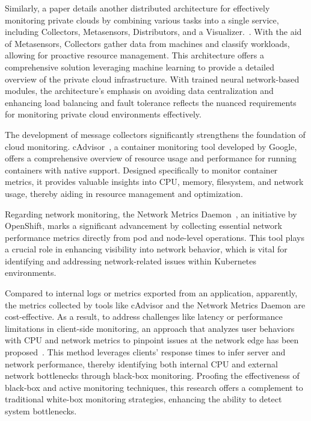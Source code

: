 Similarly, a paper details another distributed architecture for effectively monitoring private clouds by combining various tasks into a single service, including Collectors, Metasensors, Distributors, and a Visualizer.~\parencite{perez-espinozaDistributedArchitectureMonitoring2015}. With the aid of Metasensors, Collectors gather data from machines and classify workloads, allowing for proactive resource management. This architecture offers a comprehensive solution leveraging machine learning to provide a detailed overview of the private cloud infrastructure. With trained neural network-based modules, the architecture's emphasis on avoiding data centralization and enhancing load balancing and fault tolerance reflects the nuanced requirements for monitoring private cloud environments effectively. 

The development of message collectors significantly strengthens the foundation of cloud monitoring. cAdvisor~\parencite{GoogleCadvisor2024}, a container monitoring tool developed by Google, offers a comprehensive overview of resource usage and performance for running containers with native support. Designed specifically to monitor container metrics, it provides valuable insights into \ac{CPU}, memory, filesystem, and network usage, thereby aiding in resource management and optimization. 

Regarding network monitoring, the Network Metrics Daemon~\parencite{OpenshiftNetworkmetricsdaemon2023}, an initiative by OpenShift, marks a significant advancement by collecting essential network performance metrics directly from pod and node-level operations. This tool plays a crucial role in enhancing visibility into network behavior, which is vital for identifying and addressing network-related issues within Kubernetes~\parencite{ProductionGradeContainerOrchestration} environments. 

Compared to internal logs or metrics exported from an application, apparently, the metrics collected by tools like cAdvisor and the Network Metrics Daemon are cost-effective. As a result, to address challenges like latency or performance limitations in client-side monitoring, an approach that analyzes user behaviors with \ac{CPU} and network metrics to pinpoint issues at the network edge has been proposed~\parencite{filipeClientsideBlackboxMonitoring2017}. This method leverages clients' response times to infer server and network performance, thereby identifying both internal \ac{CPU} and external network bottlenecks through black-box monitoring. Proofing the effectiveness of black-box and active monitoring techniques, this research offers a complement to traditional white-box monitoring strategies, enhancing the ability to detect system bottlenecks. 

